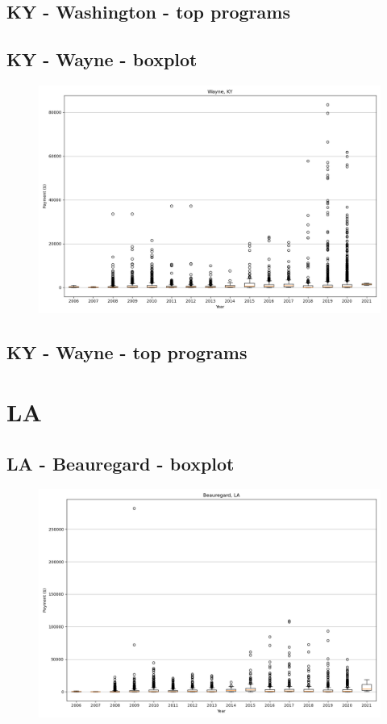\subsection*{KY - Washington - top programs}

\newpage
\subsection*{KY - Wayne - boxplot}
\begin{figure}[h]
\centering
\includegraphics[width=7in]{../output/boxplots/counties/Wayne-KY_boxplot.png}
\end{figure}


\subsection*{KY - Wayne - top programs}

\newpage
\section*{LA}
\subsection*{LA - Beauregard - boxplot}
\begin{figure}[h]
\centering
\includegraphics[width=7in]{../output/boxplots/counties/Beauregard-LA_boxplot.png}
\end{figure}



